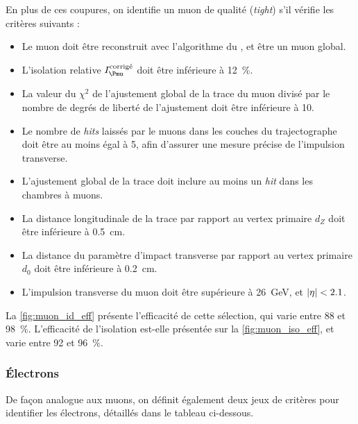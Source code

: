 En plus de ces coupures, on identifie un muon de qualité (\emph{tight}) s'il vérifie les critères suivants :
\begin{itemize}
  \item Le muon doit être reconstruit avec l'algorithme du \pf, et être un muon global.
  \item L'isolation relative $I_{\Pmu}^\text{corrigé}$ doit être inférieure à \SI{12}{\%}.
  \item La valeur du $\chi^2$ de l'ajustement global de la trace du muon divisé par le nombre de degrés de liberté de l'ajustement doit être inférieure à \num{10}.
  \item Le nombre de \emph{hits} laissés par le muons dans les couches du trajectographe doit être au moins égal à 5, afin d'assurer une mesure précise de l'impulsion transverse.
  \item L'ajustement global de la trace doit inclure au moins un \emph{hit} dans les chambres à muons.
  \item La distance longitudinale de la trace par rapport au vertex primaire $d_Z$ doit être inférieure à \SI{0.5}{\cm}.
  \item La distance du paramètre d'impact transverse par rapport au vertex primaire $d_0$ doit être inférieure à \SI{0.2}{\cm}.
  \item L'impulsion transverse du muon doit être supérieure à \SI{26}{\GeV}, et $\lvert \eta \rvert < \num{2.1}$.
\end{itemize}

La \cref{fig:muon_id_eff} présente l'efficacité de cette sélection, qui varie entre \num{88} et \SI{98}{\%}. L'efficacité de l'isolation est-elle présentée sur la \cref{fig:muon_iso_eff}, et varie entre \num{92} et \SI{96}{\%}.

\subsubsection{Électrons} \label{sec:sel_electron}

De façon analogue aux muons, on définit également deux jeux de critères pour identifier les électrons, détaillés dans le tableau ci-dessous.

